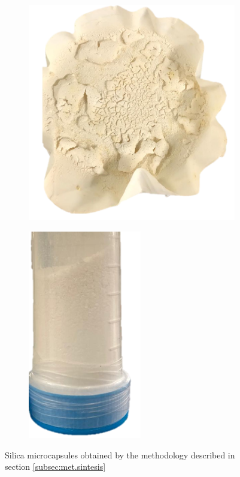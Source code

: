 \begin{refsection}
\begin{figure}[h]
    \centering
    \begin{subfigure}[b]{0.3\linewidth}           \centering
        \includegraphics[width=\linewidth]{Documento_Latex/Tesis_2/Imagenes/capsulas (2).png}
    \end{subfigure}
    \begin{subfigure}[b]{0.3\linewidth}
        \centering
        \includegraphics[width=0.5\linewidth]{Documento_Latex/Tesis_2/Imagenes/capsulas.png}
    \end{subfigure}
    \caption{Silica microcapsules obtained by the methodology described in section \ref{subsec:met.sintesis}}
    \label{fig:capsules}
\end{figure}


\end{refsection}
